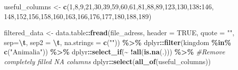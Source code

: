 \documentclass[
]{article}
\newenvironment{Shaded}{\begin{snugshade}}{\end{snugshade}}
\newcommand{\AttributeTok}[1]{\textcolor[rgb]{0.13,0.29,0.53}{#1}}
\newcommand{\CommentTok}[1]{\textcolor[rgb]{0.56,0.35,0.01}{\textit{#1}}}
\newcommand{\ConstantTok}[1]{\textcolor[rgb]{0.56,0.35,0.01}{#1}}
\newcommand{\DecValTok}[1]{\textcolor[rgb]{0.00,0.00,0.81}{#1}}
\newcommand{\FunctionTok}[1]{\textcolor[rgb]{0.13,0.29,0.53}{\textbf{#1}}}
\newcommand{\NormalTok}[1]{#1}
\newcommand{\OtherTok}[1]{\textcolor[rgb]{0.56,0.35,0.01}{#1}}
\newcommand{\SpecialCharTok}[1]{\textcolor[rgb]{0.81,0.36,0.00}{\textbf{#1}}}
\newcommand{\StringTok}[1]{\textcolor[rgb]{0.31,0.60,0.02}{#1}}
\begin{document}
\begin{Shaded}
\begin{Highlighting}[]
\NormalTok{useful\_columns }\OtherTok{\textless{}{-}} \FunctionTok{c}\NormalTok{(}\DecValTok{1}\NormalTok{,}\DecValTok{8}\NormalTok{,}\DecValTok{9}\NormalTok{,}\DecValTok{21}\NormalTok{,}\DecValTok{30}\NormalTok{,}\DecValTok{39}\NormalTok{,}\DecValTok{59}\NormalTok{,}\DecValTok{60}\NormalTok{,}\DecValTok{61}\NormalTok{,}\DecValTok{81}\NormalTok{,}\DecValTok{88}\NormalTok{,}\DecValTok{89}\NormalTok{,}\DecValTok{123}\NormalTok{,}\DecValTok{130}\NormalTok{,}\DecValTok{138}\SpecialCharTok{:}\DecValTok{146}\NormalTok{,}
                    \DecValTok{148}\NormalTok{,}\DecValTok{152}\NormalTok{,}\DecValTok{156}\NormalTok{,}\DecValTok{158}\NormalTok{,}\DecValTok{160}\NormalTok{,}\DecValTok{163}\NormalTok{,}\DecValTok{166}\NormalTok{,}\DecValTok{176}\NormalTok{,}\DecValTok{177}\NormalTok{,}\DecValTok{180}\NormalTok{,}\DecValTok{188}\NormalTok{,}\DecValTok{189}\NormalTok{)}

\NormalTok{filtered\_data }\OtherTok{\textless{}{-}}\NormalTok{ data.table}\SpecialCharTok{::}\FunctionTok{fread}\NormalTok{(file\_adress, }
                                   \AttributeTok{header =} \ConstantTok{TRUE}\NormalTok{, }
                                   \AttributeTok{quote =} \StringTok{""}\NormalTok{, }
                                   \AttributeTok{sep=}\StringTok{\textquotesingle{}}\SpecialCharTok{\textbackslash{}t}\StringTok{\textquotesingle{}}\NormalTok{, }
                                   \AttributeTok{sep2 =} \StringTok{\textquotesingle{}}\SpecialCharTok{\textbackslash{}t}\StringTok{\textquotesingle{}}\NormalTok{, }
                                   \AttributeTok{na.strings =} \FunctionTok{c}\NormalTok{(}\StringTok{""}\NormalTok{)) }\SpecialCharTok{\%\textgreater{}\%}
\NormalTok{  dplyr}\SpecialCharTok{::}\FunctionTok{filter}\NormalTok{(kingdom }\SpecialCharTok{\%in\%} \FunctionTok{c}\NormalTok{(}\StringTok{"Animalia"}\NormalTok{)) }\SpecialCharTok{\%\textgreater{}\%} 
\NormalTok{  dplyr}\SpecialCharTok{::}\FunctionTok{select\_if}\NormalTok{(}\SpecialCharTok{\textasciitilde{}} \SpecialCharTok{!}\FunctionTok{all}\NormalTok{(}\FunctionTok{is.na}\NormalTok{(.))) }\SpecialCharTok{\%\textgreater{}\%} \CommentTok{\#Remove completely filled NA columns}
\NormalTok{  dplyr}\SpecialCharTok{::}\FunctionTok{select}\NormalTok{(}\FunctionTok{all\_of}\NormalTok{(useful\_columns)) }
\end{Highlighting}
\end{Shaded}
\end{document}
